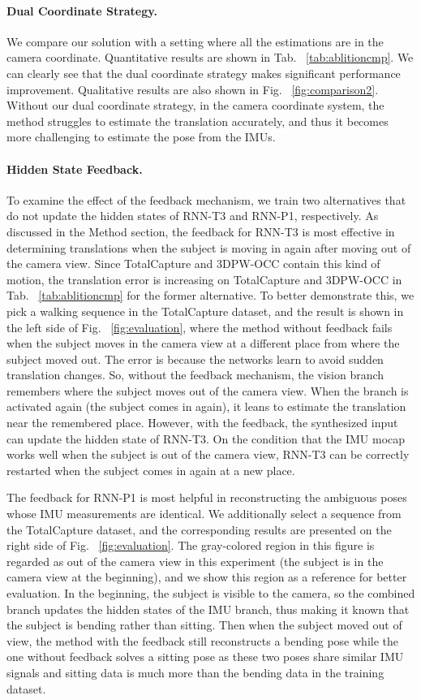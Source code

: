 \documentclass[sigconf,nonacm=true]{acmart}
\begin{document}
\paragraph{Dual Coordinate Strategy.}
We compare our solution with a setting where all the estimations are in the camera coordinate.
Quantitative results are shown in Tab. ~\ref{tab:ablitioncmp}.
We can clearly see that the dual coordinate strategy makes significant performance improvement.
Qualitative results are also shown in Fig. ~\ref{fig:comparison2}.
Without our dual coordinate strategy, in the camera coordinate system, the method struggles to estimate the translation accurately, and thus it becomes more challenging to estimate the pose from the IMUs.  
\paragraph{Hidden State Feedback.}
To examine the effect of the feedback mechanism, we train two alternatives that do not update the hidden states of RNN-T3 and RNN-P1, respectively.
As discussed in the Method section, the feedback for RNN-T3 is most effective in determining translations when the subject is moving in again after moving out of the camera view.
Since TotalCapture and 3DPW-OCC contain this kind of motion, the translation error is increasing on TotalCapture and 3DPW-OCC in Tab. ~\ref{tab:ablitioncmp} for the former alternative.
To better demonstrate this, we pick a walking sequence in the TotalCapture dataset, and the result is shown in the left side of Fig. ~\ref{fig:evaluation}, where the method without feedback fails when the subject moves in the camera view at a different place from where the subject moved out.
The error is because the networks learn to avoid sudden translation changes.
So, without the feedback mechanism, the vision branch remembers where the subject moves out of the camera view. When the branch is activated again (the subject comes in again), it leans to estimate the translation near the remembered place.
However, with the feedback, the synthesized input  can update the hidden state of RNN-T3. On the condition that the IMU mocap works well when the subject is out of the camera view, RNN-T3 can be correctly restarted when the subject comes in again at a new place. 
\par
The feedback for RNN-P1 is most helpful in reconstructing the ambiguous poses whose IMU measurements are identical.
We additionally select a sequence from the TotalCapture dataset, and the corresponding results are presented on the right side of Fig. ~\ref{fig:evaluation}.
The gray-colored region in this figure is regarded as out of the camera view in this experiment (the subject is in the camera view at the beginning), and we show this region as a reference for better evaluation.
In the beginning, the subject is visible to the camera, so the combined branch updates the hidden states of the IMU branch, thus making it known that the subject is bending rather than sitting.
Then when the subject moved out of view, the method with the feedback still reconstructs a bending pose while the one without feedback solves a sitting pose as these two poses share similar IMU signals and sitting data is much more than the bending data in the training dataset.
\end{document}
